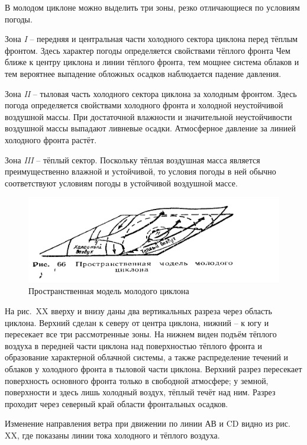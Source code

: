 \documentclass[a4paper, 12pt, twoside, final, book, russian, fittopage, cyremdash, openright]{ncc}
\begin{document}
В молодом циклоне можно выделить три зоны, резко отличающиеся по условиям погоды.

Зона \textit{I} \--- передняя и центральная части холодного сектора
циклона перед тёплым фронтом. Здесь характер погоды определяется
свойствами тёплого фронта Чем ближе к центру циклона и линии тёплого
фронта, тем мощнее система облаков и тем вероятнее выпадение обложных
осадков наблюдается падение давления.

Зона \textit{II} \--- тыловая часть холодного сектора циклона за холодным
фронтом. Здесь погода определяется свойствами холодного фронта и
холодной неустойчивой воздушной массы. При достаточной влажности и
значительной неустойчивости воздушной массы выпадают ливневые
осадки. Атмосферное давление за линией холодного фронта растёт.

Зона \textit{III} \--- тёплый сектор. Поскольку тёплая воздушная масса
является преимущественно влажной и устойчивой, то условия погоды в
ней обычно соответствуют условиям погоды в устойчивой воздушной массе.

\begin{figure}[htb]
   \centering
   \includegraphics[scale=1]{13_cyclon_model.pdf}
   \caption{Пространственная модель молодого циклона}
   \label{fig:cyclon_model}
\end{figure}

На рис.~XX вверху и внизу даны два вертикальных разреза через область
циклона. Верхний сделан к северу от центра циклона, нижний \--- к югу и
пересекает все три рассмотренные зоны. На нижнем виден подъём тёплого
воздуха в передней части циклона над поверхностью тёплого фронта и
образование характерной облачной системы, а также распределение
течений и облаков у холодного фронта в тыловой части циклона. Верхний
разрез пересекает поверхность основного фронта только в свободной
атмосфере; у земной, поверхности и здесь лишь холодный воздух, тёплый
течёт над ним. Разрез проходит через северный край области фронтальных
осадков.

Изменение направления ветра при движении по линии АВ и CD видно из
рис. XX, где показаны линии тока холодного и тёплого воздуха.
\end{document}
